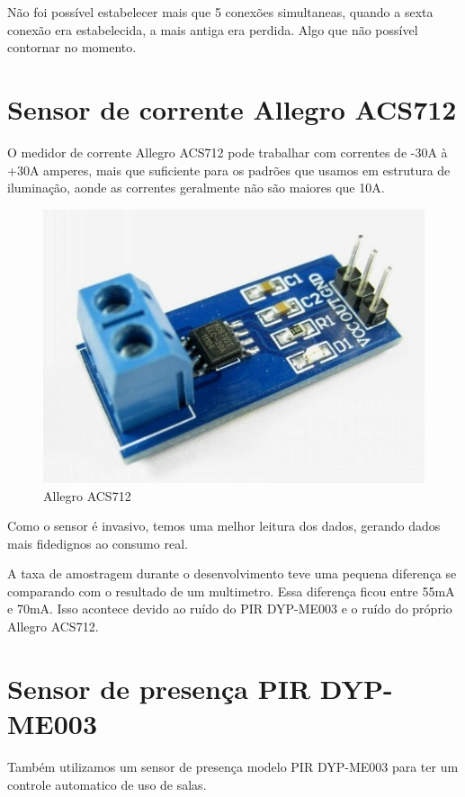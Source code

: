 \documentclass[openright]{normas-utf-tex} %
\begin{document}
Não foi possível estabelecer mais que 5 conexões simultaneas, quando a sexta conexão era estabelecida, a mais antiga era perdida. Algo que não possível contornar no momento.

\section{Sensor de corrente Allegro ACS712}
O medidor de corrente Allegro ACS712  \cite{Allegro} pode trabalhar com correntes de -30A à +30A   \cite{Allegro} amperes, mais que suficiente para os padrões que usamos em estrutura de iluminação, aonde as correntes geralmente não são maiores que 10A.

\begin{figure}[!htb]
     \centering
     \includegraphics[scale=0.6]{AllegroACS712.jpg}
     \caption{Allegro ACS712}
     \label{fig:AllegreoACS712}
\end{figure}

Como o sensor é invasivo, temos uma melhor leitura dos dados, gerando dados mais fidedignos ao consumo real.

A taxa de amostragem durante o desenvolvimento teve uma pequena diferença se comparando com o resultado de um multimetro. Essa diferença ficou entre 55mA e 70mA. Isso acontece devido ao ruído do PIR DYP-ME003 e o ruído do próprio Allegro ACS712.

\section{Sensor de presença PIR DYP-ME003}

Também utilizamos um sensor de presença modelo PIR DYP-ME003   \cite{openimpulse}
para ter um controle automatico de uso de salas.
\end{document}
